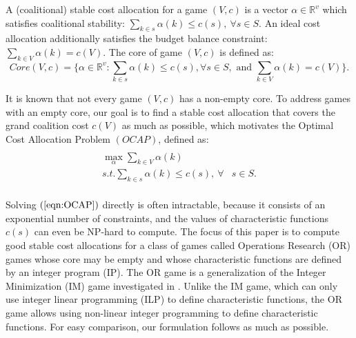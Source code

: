 \documentclass[ijoc,nonblindrev]{informs3} %
\newcommand{\R}{\mathbb{R}}
\begin{document}
A (coalitional) stable cost allocation for a  game $(V,c)$ is a vector $\alpha \in \R^{v}$ which satisfies coalitional stability:
$\sum_{k \in s} \alpha(k) \leq c(s),~ \forall s \in S$.
An ideal cost allocation additionally satisfies the budget balance constraint:
$\sum_{k \in V} \alpha(k) = c( V)$.
The core of  game $(V,c)$ is defined as:
\begin {equation*} \label{eqn:budgetbalance}
Core(V,c)=\{\alpha \in \R^{v}:\sum_{k \in s} \alpha(k) \leq c(s),\forall s \in S, \mbox{ and } \sum_{k \in V} \alpha(k) = c( V)\}.
\end {equation*}


It is known that not every game $(V,c)$  has a non-empty core. To address games with an empty core, our goal is to find a stable cost allocation that covers the grand coalition cost $c(V)$ as much as possible, which motivates the Optimal Cost Allocation Problem $(OCAP)$, defined as:
\begin{eqnarray}\label{eqn:OCAP}
\begin{aligned}
\begin{split}
\max_{\alpha} \sum_{k \in V} \alpha(k)&\\
s.t. \sum_{k \in s} \alpha(k) \leq  c(s),~ \forall &s \in S.
\end{split}
\end{aligned}
\end{eqnarray}

Solving $(\ref{eqn:OCAP})$ directly is often intractable, because it consists of an exponential number of constraints, and the values of characteristic functions $c(s)$ can even be NP-hard to compute.
The focus of this paper is to compute good stable cost allocations for a class of games called Operations Research (OR) games whose core may be empty and whose characteristic functions are defined by an integer program (IP). The OR game is a generalization of the Integer Minimization (IM) game investigated in \cite{Caprara2010LPB}. Unlike the IM game,  which can only use integer linear programming (ILP) to define  characteristic functions, the OR game allows using non-linear integer programming to define characteristic functions. For easy comparison, our formulation follows \cite{Caprara2010LPB} as much as possible.
\end{document}
